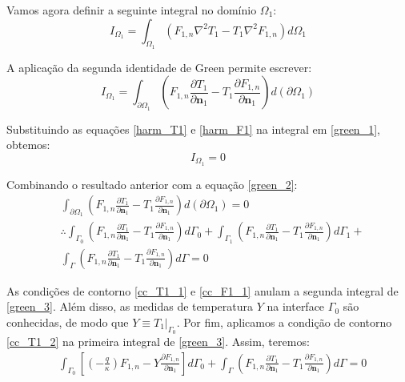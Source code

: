 Vamos agora definir a seguinte integral no domínio $\Omega_1$:
\begin{equation}
	I_{\Omega_1} = \int_{\Omega_1}(F_{1,n}\nabla^2T_1 - T_1\nabla^2F_{1,n})d\Omega_1 \label{green_1}
\end{equation}

A aplicação da segunda identidade de Green permite escrever:
\begin{equation}
	I_{\Omega_1} = \int_{\partial\Omega_1}\left(F_{1,n}\frac{\partial T_1}{\partial\mathbf{n}_1} - T_1\frac{\partial F_{1,n}}{\partial\mathbf{n}_1}\right)d(\partial\Omega_1) \label{green_2}
\end{equation}

Substituindo as equações \eqref{harm_T1} e \eqref{harm_F1} na integral em \eqref{green_1}, obtemos:
\begin{equation}
	I_{\Omega_1} = 0
\end{equation}

Combinando o resultado anterior com a equação \eqref{green_2}:
\begin{align}
	&
	\int_{\partial\Omega_1}\left(F_{1,n}\frac{\partial T_1}{\partial\mathbf{n}_1} - T_1\frac{\partial F_{1,n}}{\partial\mathbf{n}_1}\right)d(\partial\Omega_1)
	=
	0 \nonumber \\
	&
	\therefore
	\int_{\Gamma_0}\left(F_{1,n}\frac{\partial T_1}{\partial\mathbf{n}_1} - T_1\frac{\partial F_{1,n}}{\partial\mathbf{n}_1}\right)d\Gamma_0
	+
	\int_{\Gamma_1}\left(F_{1,n}\frac{\partial T_1}{\partial\mathbf{n}_1} - T_1\frac{\partial F_{1,n}}{\partial\mathbf{n}_1}\right)d\Gamma_1
	+ \nonumber \\
	&
	\int_{\Gamma}\left(F_{1,n}\frac{\partial T_1}{\partial\mathbf{n}_1} - T_1\frac{\partial F_{1,n}}{\partial\mathbf{n}_1}\right)d\Gamma
	=
	0 \label{green_3}
\end{align}

As condições de contorno \eqref{cc_T1_1} e \eqref{cc_F1_1} anulam a segunda integral de \eqref{green_3}. Além disso, as medidas de temperatura
$Y$ na interface $\Gamma_0$ são conhecidas, de modo que $Y \equiv T_1|_{\Gamma_0}$. Por fim, aplicamos a condição de contorno \eqref{cc_T1_2}
na primeira integral de \eqref{green_3}. Assim, teremos:
\begin{align}
	&
	\int_{\Gamma_0}\left[\left(-\frac{q}{\kappa}\right)F_{1,n} - Y\frac{\partial F_{1,n}}{\partial\mathbf{n}_1}\right]d\Gamma_0
	+
	\int_{\Gamma}\left(F_{1,n}\frac{\partial T_1}{\partial\mathbf{n}_1} - T_1\frac{\partial F_{1,n}}{\partial\mathbf{n}_1}\right)d\Gamma
	=
	0 \label{green_4}
\end{align}

